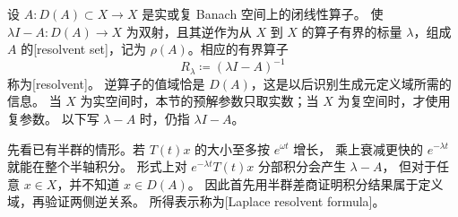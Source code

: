 设 \(A:D(A)\subset X\to X\) 是实或复 Banach 空间上的闭线性算子。
使 \(\lambda I-A:D(A)\to X\) 为双射，且其逆作为从 \(X\) 到 \(X\) 的算子有界的标量
\(\lambda\)，组成 \(A\) 的[resolvent set]，记为
\(\rho(A)\)。相应的有界算子
\[
 R_\lambda\coloneqq(\lambda I-A)^{-1}
\]
称为[resolvent]。
逆算子的值域恰是 \(D(A)\)，这是以后识别生成元定义域所需的信息。
当 \(X\) 为实空间时，本节的预解参数只取实数；当 \(X\) 为复空间时，才使用复参数。
以下写 \(\lambda-A\) 时，仍指 \(\lambda I-A\)。

先看已有半群的情形。若 \(T(t)x\) 的大小至多按 \(e^{\omega t}\) 增长，
乘上衰减更快的 \(e^{-\lambda t}\) 就能在整个半轴积分。
形式上对 \(e^{-\lambda t}T(t)x\) 分部积分会产生 \(\lambda-A\)，
但对于任意 \(x\in X\)，并不知道 \(x\in D(A)\)。
因此首先用半群差商证明积分结果属于定义域，再验证两侧逆关系。
所得表示称为[Laplace resolvent formula]。

